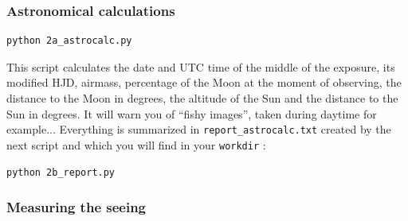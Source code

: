 % 
% 
% 
% 

\subsubsection{Astronomical calculations}

\begin{Verbatim}
python 2a_astrocalc.py
\end{Verbatim}

This script calculates the date and UTC time of the middle of the exposure, its modified HJD, airmass, percentage of the Moon at the moment of observing, the distance to the Moon in degrees, the altitude of the Sun and the distance to the Sun in degrees. It will warn you of ``fishy images'', taken during daytime for example...
Everything is summarized in \verb+report_astrocalc.txt+ created by the next script and which you will find in your \verb+workdir+ :

\begin{Verbatim}
python 2b_report.py
\end{Verbatim}

\subsubsection{Measuring the seeing}

